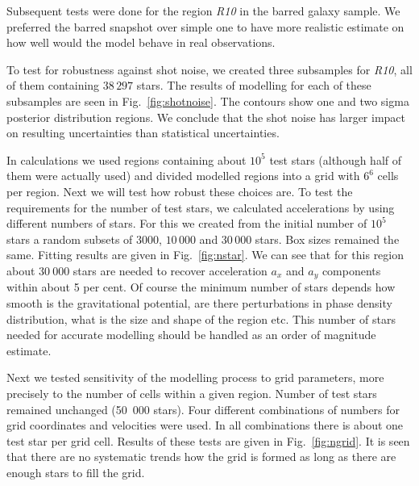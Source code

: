 \documentclass[fleqn,usenatbib]{mnras}
\begin{document}
Subsequent tests were done for the region \textit{R10} in the barred galaxy sample. We preferred the barred snapshot over simple one to have more realistic estimate on how well would the model behave in real observations. 

To test for robustness against shot noise, we created three subsamples for \textit{R10}, all of them containing $38\,297$ stars. The results of modelling for each of these subsamples are seen in Fig.~\ref{fig:shotnoise}. The contours show one and two sigma posterior distribution regions. We conclude that the shot noise has larger impact on resulting uncertainties than statistical uncertainties.  

In calculations we used regions containing about $10^5$ test stars (although half of them were actually used) and divided modelled regions into a grid with $6^6$ cells per region. Next we will test how robust these choices are. To test the requirements for the number of test stars, we calculated accelerations by using  different numbers of stars. For this we created from the initial number of $10^5$ stars a random subsets of $3000$, $10\,000$ and $30\,000$ stars. Box sizes remained the same. Fitting results are given in Fig.~\ref{fig:nstar}. We can see that for this region about $30~000$ stars are needed to recover acceleration $a_x$ and $a_y$ components within about 5 per cent. Of course the minimum number of stars depends how smooth is the gravitational potential, are there perturbations in phase density distribution, what is the size and shape of the region etc. This number of stars needed for accurate modelling should be handled as an order of magnitude estimate.

Next we tested sensitivity of the modelling process to grid parameters, more precisely to the number of cells within a given region. Number of test stars remained unchanged (50~000 stars). Four different combinations of numbers for grid coordinates and velocities were used. In all combinations there is about one test star per grid cell. Results of these tests are given in Fig.~\ref{fig:ngrid}. It is seen that there are no systematic trends how the grid is formed as long as there are enough stars to fill the grid.  
\end{document}
